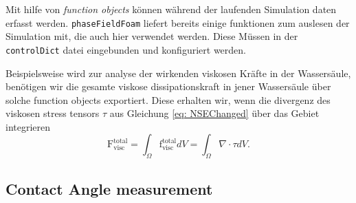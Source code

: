 Mit hilfe von \textit{function objects} können während der laufenden Simulation daten erfasst werden. \texttt{phaseFieldFoam} liefert bereits einige funktionen zum auslesen der Simulation mit, die auch hier verwendet werden. Diese Müssen in der \texttt{controlDict} datei eingebunden und konfiguriert werden. 

Beispielsweise wird zur analyse der wirkenden viskosen Kräfte in der Wassersäule, benötigen wir die gesamte viskose dissipationskraft in jener Wassersäule über solche function objects exportiert. Diese erhalten wir, wenn die divergenz des viskosen stress tensors $\tau$ aus Gleichung \ref{eq: NSEChanged} über das Gebiet integrieren
\begin{equation}
    \label{eq: totalViscForce}
    \mathrm{F}_{\mathrm{visc}}^{\mathrm{total}} = \int_{\Omega} \mathrm{f}_{\mathrm{visc}}^{\mathrm{total}} dV = \int_{\Omega} \nabla \cdot \tau dV.
\end{equation}



\subsection{Contact Angle measurement}
\label{sec: CA_Measurement}


